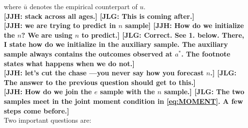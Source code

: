 \noindent where $\bar{u}$ denotes the empirical counterpart of $u$.\\

\noindent \textbf{[JJH: stack across all ages.] [JLG: This is coming after.]}\\


\noindent \textbf{[JJH: we are trying to predict in $n$ sample] [JJH: How do we initialize the $n$? We are using $n$ to predict.] [JLG: Correct. See 1. below. There, I state how do we initialize in the auxiliary sample. The auxiliary sample always contains the outcomes observed at $a^*$. The footnote states what happens when we do not.]}\\

\noindent \textbf{[JJH: let's cut the chase ---you never say how you forecast $n$.] [JLG: The answer to the previous question should get to this.]}\\

\noindent \textbf{[JJH: How do we join the $e$ sample with the $n$ sample.] [JLG: The two samples meet in the joint moment condition in \eqref{eq:MOMENT}. A few steps come before.]}\\

\noindent Two important questions are:

